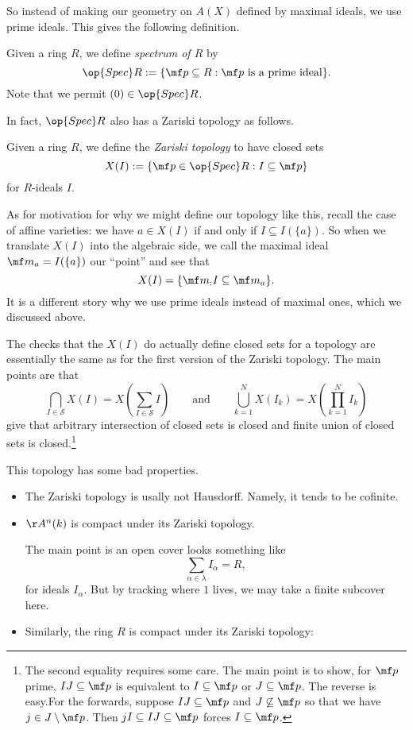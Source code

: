 So instead of making our geometry on $A(X)$ defined by maximal ideals, we use prime ideals. This gives the following definition.
\begin{definition}
	Given a ring $R$, we define \textit{spectrum of $R$} by
	\[\op{Spec}R:=\{\mf p\subseteq R:\mf p\text{ is a prime ideal}\}.\]
	Note that we permit $(0)\in\op{Spec}R$.
\end{definition}
In fact, $\op{Spec}R$ also has a Zariski topology as follows.
\begin{definition}
	Given a ring $R$, we define the \textit{Zariski topology} to have closed sets
	\[X(I):=\{\mf p\in\op{Spec}R:I\subseteq\mf p\}\]
	for $R$-ideals $I$.
\end{definition}
\begin{remark}[Nir]
	As for motivation for why we might define our topology like this, recall the case of affine varieties: we have $a\in X(I)$ if and only if $I\subseteq I(\{a\})$. So when we translate $X(I)$ into the algebraic side, we call the maximal ideal $\mf m_a=I(\{a\})$ our ``point'' and see that
	\[X(I)=\{\mf m_:I\subseteq\mf m_a\}.\]
	It is a different story why we use prime ideals instead of maximal ones, which we discussed above.
\end{remark}
The checks that the $X(I)$ do actually define closed sets for a topology are essentially the same as for the first version of the Zariski topology. The main points are that
\[\bigcap_{I\in\mathcal S}X(I)=X\left(\sum_{I\in\mathcal S}I\right)\qquad\text{and}\qquad\bigcup_{k=1}^NX(I_k)=X\left(\prod_{k=1}^NI_k\right)\]
give that arbitrary intersection of closed sets is closed and finite union of closed sets is closed.\footnote{The second equality requires some care. The main point is to show, for $\mf p$ prime, $IJ\subseteq\mf p$ is equivalent to $I\subseteq\mf p$ or $J\subseteq\mf p$. The reverse is easy.For the forwards, suppose $IJ\subseteq\mf p$ and $J\not\subseteq\mf p$ so that we have $j\in J\setminus\mf p$. Then $jI\subseteq IJ\subseteq\mf p$ forces $I\subseteq\mf p$.}

This topology has some bad properties.
\begin{itemize}
	\item The Zariski topology is usally not Hausdorff. Namely, it tends to be cofinite.
	\item $\AA^n(k)$ is compact under its Zariski topology.

	The main point is an open cover looks something like
	\[\sum_{\alpha\in\lambda}I_\alpha=R,\]
	for ideals $I_\alpha$. But by tracking where $1$ lives, we may take a finite subcover here.
	\item Similarly, the ring $R$ is compact under its Zariski topology:
\end{itemize}

